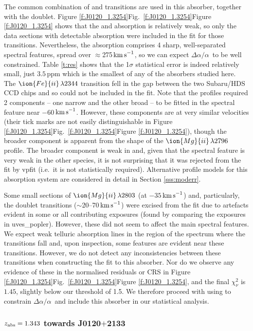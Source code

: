 \documentclass[fleqn,usenatbib,usedcolumn]{mnras}
\newcommand{\Sref}[1]{Section \ref{#1}}
\newcommand{\Tref}[1]{Table \ref{#1}}
\newcommand{\Fref}[1]{\ifhmode \ifnum\spacefactor=1001 Figure \ref{#1}\else Fig.\ \ref{#1}\fi \else Figure \ref{#1}\fi}
\newcommand{\kms}{\ensuremath{\textrm{km\,s}^{-1}}}
\newcommand{\zab}{\ensuremath{z_\textrm{\scriptsize abs}}}
\newcommand{\tran}[3]{\ensuremath{\ion{#1}{#2}\,\lambda\textrm{#3}}}
\newcommand{\daa}{\ensuremath{\Delta\alpha/\alpha}}
\begin{document}
The common combination of  and  transitions are used in this absorber, together with the  doublet. \Fref{f:J0120_1.3254} shows that the  and  absorption is relatively weak, so only the data sections with detectable absorption were included in the fit for those transitions. Nevertheless, the absorption comprises 4 sharp, well-separated spectral features, spread over $\approx$275\,\kms, so we can expect \daa\ to be well constrained. \Tref{t:res} shows that the 1$\sigma$ statistical error is indeed relatively small, just $3.5$\,ppm which is the smallest of any of the absorbers studied here. The \tran{Fe}{ii}{2344} transition fell in the gap between the two Subaru/HDS CCD chips and so could not be included in the fit. Note that the  profiles required 2 components -- one narrow and the other broad -- to be fitted in the spectral feature near $-60$\,\kms. However, these components are at very similar velocities (their tick marks are not easily distinguishable in \Fref{f:J0120_1.3254}), though the broader component is apparent from the shape of the \tran{Mg}{ii}{2796} profile. The broader component is weak in  and, given that the spectral feature is very weak in the other species, it is not surprising that it was rejected from the fit by {\sc vpfit} (i.e.\ it is not statistically required). Alternative profile models for this absorption system are considered in detail in \Sref{sss:moderr}.

Some small sections of \tran{Mg}{ii}{2803} (at $-35$\,\kms) and, particularly, the  doublet transitions ($\sim$20--70\,\kms) were excised from the fit due to artefacts evident in some or all contributing exposures (found by comparing the exposures in {\sc uves\_popler}). However, these did not seem to affect the main spectral features. We expect weak telluric absorption lines in the region of the spectrum where the  transitions fall and, upon inspection, some features are evident near these transitions. However, we do not detect any inconsistencies between these transitions when constructing the fit to this absorber. Nor do we observe any evidence of these in the normalised residuals or CRS in \Fref{f:J0120_1.3254}, and the final $\chi^2_\nu$ is $1.45$, slightly below our threshold of 1.5. We therefore proceed with using  to constrain \daa\ and include this absorber in our statistical analysis.


\subsubsection{$\zab=1.343$ towards J0120$+$2133}\label{sss:J0120_1.3430}
\end{document}
